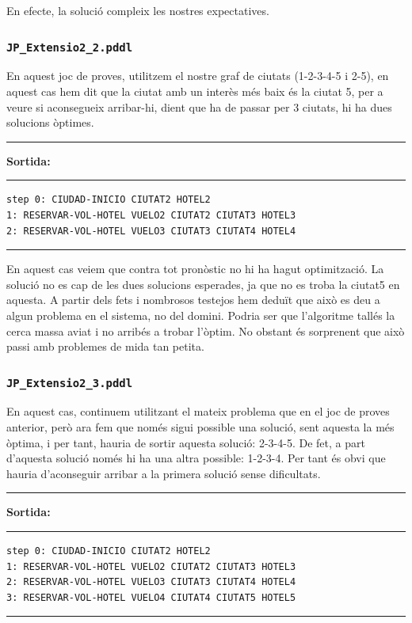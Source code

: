 \documentclass[11pt,a4paper]{article}
\begin{document}
En efecte, la solució compleix les nostres expectatives.

\subsubsection*{\texttt{JP\_Extensio2\_2.pddl}}

En aquest joc de proves, utilitzem el nostre graf de ciutats (1-2-3-4-5 i 2-5), en aquest cas hem dit que la ciutat amb un interès més baix és la ciutat 5, per a veure si aconsegueix arribar-hi, dient que ha de passar per 3 ciutats, hi ha dues solucions òptimes.

\begin{samepage}
\medskip
\noindent
\rule{0.1\textwidth}{0.5mm}
\textbf{Sortida:}
\rule{0.76\textwidth}{0.5mm}
\begin{verbatim}
step 0: CIUDAD-INICIO CIUTAT2 HOTEL2
1: RESERVAR-VOL-HOTEL VUELO2 CIUTAT2 CIUTAT3 HOTEL3
2: RESERVAR-VOL-HOTEL VUELO3 CIUTAT3 CIUTAT4 HOTEL4
\end{verbatim}
\rule{\textwidth}{0.5mm}
\medskip
\end{samepage}

En aquest cas veiem que contra tot pronòstic no hi ha hagut optimització. La solució no es cap de les dues solucions esperades, ja que no es troba la ciutat5 en aquesta. A partir dels fets i nombrosos testejos hem deduït que això es deu a algun problema en el sistema, no del domini. Podria ser que l'algoritme tallés la cerca massa aviat i no arribés a trobar l'òptim. No obstant és sorprenent que això passi amb problemes de mida tan petita.

\subsubsection*{\texttt{JP\_Extensio2\_3.pddl}}

En aquest cas, continuem utilitzant el mateix problema que en el joc de proves anterior, però ara fem que només sigui possible una solució, sent aquesta la més òptima, i per tant, hauria de sortir aquesta solució: 2-3-4-5. De fet, a part d'aquesta solució només hi ha una altra possible: 1-2-3-4. Per tant és obvi que hauria d'aconseguir arribar a la primera solució sense dificultats.

\begin{samepage}
\medskip
\noindent
\rule{0.1\textwidth}{0.5mm}
\textbf{Sortida:}
\rule{0.76\textwidth}{0.5mm}
\begin{verbatim}
step 0: CIUDAD-INICIO CIUTAT2 HOTEL2
1: RESERVAR-VOL-HOTEL VUELO2 CIUTAT2 CIUTAT3 HOTEL3
2: RESERVAR-VOL-HOTEL VUELO3 CIUTAT3 CIUTAT4 HOTEL4
3: RESERVAR-VOL-HOTEL VUELO4 CIUTAT4 CIUTAT5 HOTEL5
\end{verbatim}
\rule{\textwidth}{0.5mm}
\medskip
\end{samepage}
\end{document}
